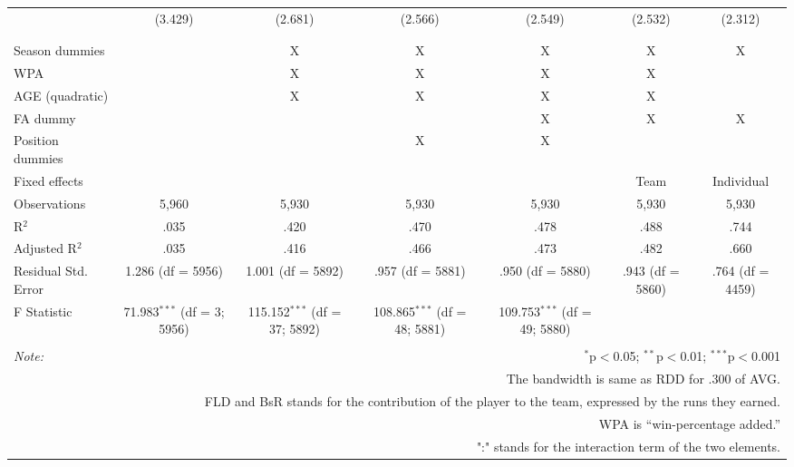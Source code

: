 \begin{table}[H]
\begin{tabular}{@{\extracolsep{5pt}}lcccccc}
  & (3.429) & (2.681) & (2.566) & (2.549) & (2.532) & (2.312) \\
  & & & & & & \\
\hline \\[-1.8ex]
Season dummies &  & X & X & X & X & X \\
WPA &  & X & X & X & X &  \\
AGE (quadratic) &  & X & X & X & X &  \\
FA dummy &  &  &  & X & X & X \\
Position dummies &  &  & X & X &  &  \\
Fixed effects &  &  &  &  & Team & Individual \\
Observations & 5,960 & 5,930 & 5,930 & 5,930 & 5,930 & 5,930 \\
R$^{2}$ & .035 & .420 & .470 & .478 & .488 & .744 \\
Adjusted R$^{2}$ & .035 & .416 & .466 & .473 & .482 & .660 \\
Residual Std. Error & 1.286 (df = 5956) & 1.001 (df = 5892) & .957 (df = 5881) & .950 (df = 5880) & .943 (df = 5860) & .764 (df = 4459) \\
F Statistic & 71.983$^{***}$ (df = 3; 5956) & 115.152$^{***}$ (df = 37; 5892) & 108.865$^{***}$ (df = 48; 5881) & 109.753$^{***}$ (df = 49; 5880) &  &  \\
\hline
\hline \\[-1.8ex]
\textit{Note:}  & \multicolumn{6}{r}{$^{*}$p$<$0.05; $^{**}$p$<$0.01; $^{***}$p$<$0.001} \\
& \multicolumn{6}{r}{The bandwidth is same as RDD for .300 of AVG.} \\
& \multicolumn{6}{r}{FLD and BsR stands for the contribution of the player to the team, expressed by the runs they earned.} \\
& \multicolumn{6}{r}{WPA is ``win-percentage added.''} \\
& \multicolumn{6}{r}{":" stands for the interaction term of the two elements.} \\
\end{tabular}
\end{table}
